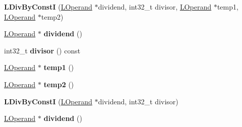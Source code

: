 \begin{DoxyCompactItemize}
\item 
{\bfseries L\+Div\+By\+ConstI} (\hyperlink{classv8_1_1internal_1_1_l_operand}{L\+Operand} $\ast$dividend, int32\+\_\+t divisor, \hyperlink{classv8_1_1internal_1_1_l_operand}{L\+Operand} $\ast$temp1, \hyperlink{classv8_1_1internal_1_1_l_operand}{L\+Operand} $\ast$temp2)\hypertarget{classv8_1_1internal_1_1_l_div_by_const_i_a2e3dda604aa41033468bfe062f3ff613}{}\label{classv8_1_1internal_1_1_l_div_by_const_i_a2e3dda604aa41033468bfe062f3ff613}

\item 
\hyperlink{classv8_1_1internal_1_1_l_operand}{L\+Operand} $\ast$ {\bfseries dividend} ()\hypertarget{classv8_1_1internal_1_1_l_div_by_const_i_aa810bcd07c3b1e6e6fefc71b0125b9fb}{}\label{classv8_1_1internal_1_1_l_div_by_const_i_aa810bcd07c3b1e6e6fefc71b0125b9fb}

\item 
int32\+\_\+t {\bfseries divisor} () const \hypertarget{classv8_1_1internal_1_1_l_div_by_const_i_a54e98ed246800cdb3d19b87abf836d6a}{}\label{classv8_1_1internal_1_1_l_div_by_const_i_a54e98ed246800cdb3d19b87abf836d6a}

\item 
\hyperlink{classv8_1_1internal_1_1_l_operand}{L\+Operand} $\ast$ {\bfseries temp1} ()\hypertarget{classv8_1_1internal_1_1_l_div_by_const_i_af66612b9ebb597ea81860967afc4040c}{}\label{classv8_1_1internal_1_1_l_div_by_const_i_af66612b9ebb597ea81860967afc4040c}

\item 
\hyperlink{classv8_1_1internal_1_1_l_operand}{L\+Operand} $\ast$ {\bfseries temp2} ()\hypertarget{classv8_1_1internal_1_1_l_div_by_const_i_a46fb7a65df1ba0c245d91d753df2e66c}{}\label{classv8_1_1internal_1_1_l_div_by_const_i_a46fb7a65df1ba0c245d91d753df2e66c}

\item 
{\bfseries L\+Div\+By\+ConstI} (\hyperlink{classv8_1_1internal_1_1_l_operand}{L\+Operand} $\ast$dividend, int32\+\_\+t divisor)\hypertarget{classv8_1_1internal_1_1_l_div_by_const_i_a69f3e2310ac379ab63581e0fe18bc836}{}\label{classv8_1_1internal_1_1_l_div_by_const_i_a69f3e2310ac379ab63581e0fe18bc836}

\item 
\hyperlink{classv8_1_1internal_1_1_l_operand}{L\+Operand} $\ast$ {\bfseries dividend} ()\hypertarget{classv8_1_1internal_1_1_l_div_by_const_i_aa810bcd07c3b1e6e6fefc71b0125b9fb}{}\label{classv8_1_1internal_1_1_l_div_by_const_i_aa810bcd07c3b1e6e6fefc71b0125b9fb}


\end{DoxyCompactItemize}
